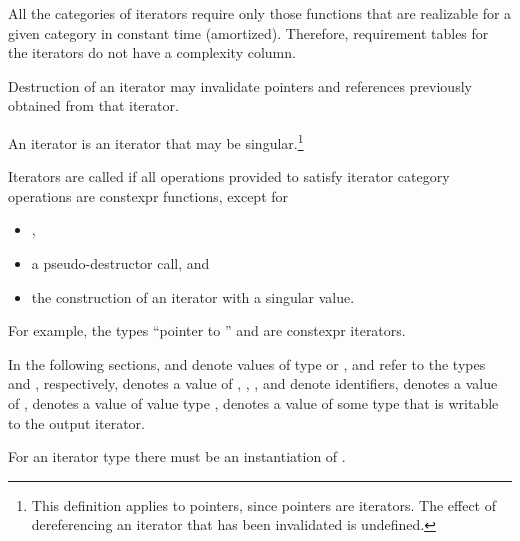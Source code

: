 \pnum
All the categories of iterators require only those functions that are realizable for a given category in
constant time (amortized).
Therefore, requirement tables for the iterators do not have a complexity column.

\pnum
Destruction of an iterator  may invalidate pointers and references
previously obtained from that iterator.

\pnum
An
iterator is an iterator that may be singular.\footnote{This definition applies to pointers, since pointers are iterators.
The effect of dereferencing an iterator that has been invalidated
is undefined.
}

\pnum
{}
Iterators are called 
if all operations provided to satisfy iterator category operations
are constexpr functions, except for
\begin{itemize}
\item {},
\item a pseudo-destructor call, and
\item the construction of an iterator with a singular value.
\end{itemize}
\begin{note}
For example, the types ``pointer to '' and
 are constexpr iterators.
\end{note}

\begin{removedblock}
\pnum
In the following sections,
and
denote values of type
 or ,
 and  refer to the
types  and
, respectively,
denotes a value of
,
,
,
and
denote identifiers,
denotes a value of
,
denotes a value of value type
,
denotes a value of some type that is writable to the output iterator.
\begin{note} For an iterator type  there must be an instantiation
of . \end{note}
\end{removedblock}


